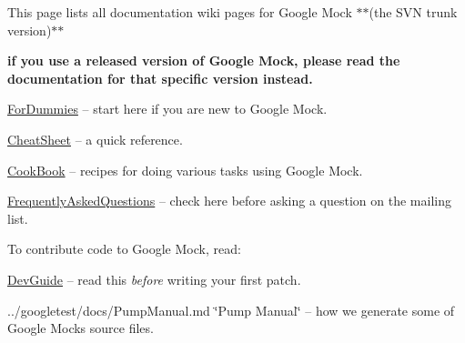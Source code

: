 This page lists all documentation wiki pages for Google Mock $\ast$$\ast$(the S\+VN trunk version)$\ast$$\ast$
\begin{DoxyItemize}
\item {\bfseries if you use a released version of Google Mock, please read the documentation for that specific version instead.}
\begin{DoxyItemize}
\item \hyperlink{v1__7_2ForDummies_8md}{For\+Dummies} -- start here if you are new to Google Mock.
\item \hyperlink{v1__7_2CheatSheet_8md}{Cheat\+Sheet} -- a quick reference.
\item \hyperlink{v1__7_2CookBook_8md}{Cook\+Book} -- recipes for doing various tasks using Google Mock.
\item \hyperlink{v1__7_2FrequentlyAskedQuestions_8md}{Frequently\+Asked\+Questions} -- check here before asking a question on the mailing list.
\end{DoxyItemize}
\end{DoxyItemize}

To contribute code to Google Mock, read\+:


\begin{DoxyItemize}
\item \hyperlink{googletest_2docs_2DevGuide_8md}{Dev\+Guide} -- read this {\itshape before} writing your first patch.
\item ../googletest/docs/\+Pump\+Manual.md \char`\"{}\+Pump Manual\char`\"{} -- how we generate some of Google Mock\textquotesingle{}s source files. 
\end{DoxyItemize}